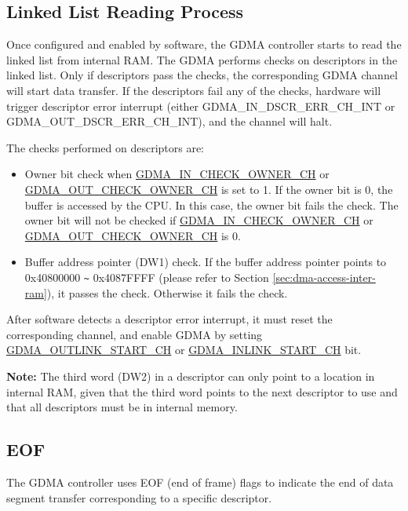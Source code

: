 \documentclass[main\_\_EN.tex]{subfiles}
\begin{document}
\subsection{Linked List Reading Process}

Once configured and enabled by software, the GDMA controller starts to read the linked list from internal RAM. The GDMA performs checks on descriptors in the linked list. Only if descriptors pass the checks, the corresponding GDMA channel will start data transfer. If the descriptors fail any of the checks, hardware will trigger descriptor error interrupt (either GDMA\_IN\_DSCR\_ERR\_CH\_INT or GDMA\_OUT\_DSCR\_ERR\_CH\_INT), and the channel will halt.

The checks performed on descriptors are:
\begin{itemize}
    \item Owner bit check when \hyperref[fielddesc:GDMAINCHECKOWNERCHN]{GDMA\_IN\_CHECK\_OWNER\_CH} or \hyperref[fielddesc:GDMAOUTCHECKOWNERCHN]{GDMA\_OUT\_CHECK\_OWNER\_CH} is set to 1. If the owner bit is 0, the buffer is accessed by the CPU. In this case, the owner bit fails the check. The owner bit will not be checked if \hyperref[fielddesc:GDMAINCHECKOWNERCHN]{GDMA\_IN\_CHECK\_OWNER\_CH} or \hyperref[fielddesc:GDMAOUTCHECKOWNERCHN]{GDMA\_OUT\_CHECK\_OWNER\_CH} is 0.
    \item Buffer address pointer (DW1) check. If the buffer address pointer points to 0x40800000 \verb+~+ 0x4087FFFF (please refer to Section \ref{sec:dma-access-inter-ram}), it passes the check. Otherwise it fails the check.
\end{itemize}

After software detects a descriptor error interrupt, it must reset the corresponding channel, and enable GDMA by setting \hyperref[fielddesc:GDMAOUTLINKSTARTCHN]{GDMA\_OUTLINK\_START\_CH} or \hyperref[fielddesc:GDMAINLINKSTARTCHN]{GDMA\_INLINK\_START\_CH} bit.

{\bfseries Note:} The third word (DW2) in a descriptor can only point to a location in internal RAM, given that the third word points to the next descriptor to use and that all descriptors must be in internal memory.

\subsection{EOF}

The GDMA controller uses EOF (end of frame) flags to indicate the end of data segment transfer corresponding to a specific descriptor.
\end{document}
